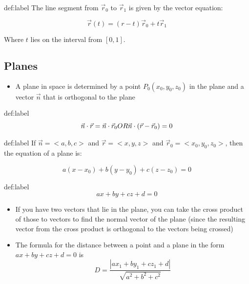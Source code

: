 \documentclass{package/notes}
\begin{document}
\begin{definition}{def:label}
	The line segment from $\vec r_0$ to $\vec r_1$ is given by the vector equation:

	$$\vec r(t) = (r-t)\vec r_0 + t\vec r_1$$

	Where $t$ lies on the interval from $[0,1]$.
\end{definition} %

\subsection{Planes}

\begin{itemize}
	\item A plane in space is determined by a point $P_0(x_0,y_0,z_0)$ in the plane and a vector $\vec n$ that is orthogonal to the plane
\end{itemize}

\begin{definition}{def:label}
	$$
	\vec n \cdot \vec r = \vec n \cdot \vec r_0\\
	OR\\
	\vec n \cdot (\vec r - \vec r_0) = 0
	$$
\end{definition} %

\begin{definition}{def:label}
	If $\vec n = <a,b,c>$ and $\vec r = <x,y,z>$ and $\vec r_0 = <x_0,y_0,z_0>$, then the equation  of a plane is:

	$$a(x-x_0) +b(y-y_0)+c(z-z_0) = 0$$
\end{definition}

\begin{definition}{def:label}
	$$ax +by+cz+d=0$$
\end{definition}

\begin{itemize}
	\item If you have two vectors that lie in the plane, you can take the cross product of those to vectors to find the normal vector of the plane (since the resulting vector from the cross product is orthogonal to 	the vectors being crossed)
	\item The formula for the distance between a point and a plane in the form $ax+by+cz+d=0$ is 
	$$
	D = \frac{|ax_1+by_1+cz_1+d|}{\sqrt{a^2+b^2+c^2}}
	$$
\end{itemize}
\end{document}
